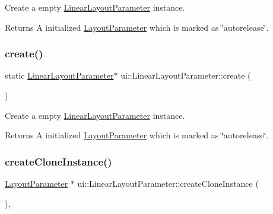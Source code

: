 Create a empty \hyperlink{classui_1_1LinearLayoutParameter}{Linear\+Layout\+Parameter} instance. \begin{DoxyReturn}{Returns}
A initialized \hyperlink{classui_1_1LayoutParameter}{Layout\+Parameter} which is marked as \char`\"{}autorelease\char`\"{}. 
\end{DoxyReturn}
\mbox{\label{classui_1_1LinearLayoutParameter_a8714c9a47d01997fda14816b373948f9}} 
\subsubsection{\texorpdfstring{create()}{create()}\hspace{0.1cm}{\footnotesize\ttfamily [2/2]}}
{\footnotesize\ttfamily static \hyperlink{classui_1_1LinearLayoutParameter}{Linear\+Layout\+Parameter}$\ast$ ui\+::\+Linear\+Layout\+Parameter\+::create (\begin{DoxyParamCaption}{ }\end{DoxyParamCaption})\hspace{0.3cm}{\ttfamily [static]}}

Create a empty \hyperlink{classui_1_1LinearLayoutParameter}{Linear\+Layout\+Parameter} instance. \begin{DoxyReturn}{Returns}
A initialized \hyperlink{classui_1_1LayoutParameter}{Layout\+Parameter} which is marked as \char`\"{}autorelease\char`\"{}. 
\end{DoxyReturn}
\mbox{\label{classui_1_1LinearLayoutParameter_a5f48d9a8e9acb1bea23e15723a3c405a}} 
\subsubsection{\texorpdfstring{create\+Clone\+Instance()}{createCloneInstance()}\hspace{0.1cm}{\footnotesize\ttfamily [1/2]}}
{\footnotesize\ttfamily \hyperlink{classui_1_1LayoutParameter}{Layout\+Parameter} $\ast$ ui\+::\+Linear\+Layout\+Parameter\+::create\+Clone\+Instance (\begin{DoxyParamCaption}{ }\end{DoxyParamCaption})\hspace{0.3cm}{\ttfamily [override]}, {\ttfamily [virtual]}}

